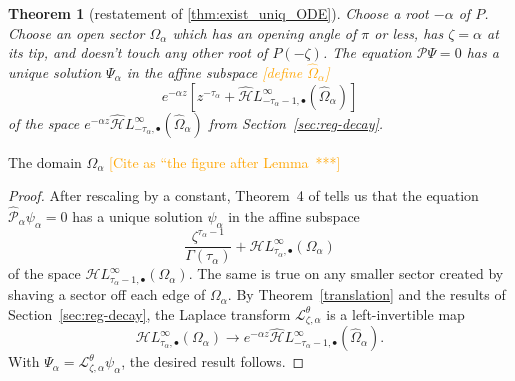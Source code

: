 \documentclass{article}
\newcommand{\singexp}[2]{\mathcal{H}L^\infty_{#1, #2}}
\newcommand{\singexpalg}[1]{\singexp{#1}{\bullet}}
\newcommand{\dualsingexp}[2]{\widehat{\mathcal{H}}L^\infty_{#1, #2}}
\newcommand{\dualsingexpalg}[1]{\dualsingexp{#1}{\bullet}}
\newcommand{\laplace}{\mathcal{L}}
\theoremstyle{definition}
\theoremstyle{plain}
\newtheorem{theorem}{Theorem}[section]
\begin{document}
\begin{theorem}[restatement of \ref{thm:exist_uniq_ODE}]\label{re:thm:exist_uniq_ODE}
Choose a root $-\alpha$ of $P$. Choose an open sector $\Omega_\alpha$ which has an opening angle of $\pi$ or less, has $\zeta = \alpha$ at its tip, and doesn't touch any other root of $P(-\zeta)$. The equation $\mathcal{P}\Psi = 0$ has a unique solution $\Psi_\alpha$ in the affine subspace \textcolor{orange}{[define $\widehat{\Omega}_\alpha$]}
\[ e^{-\alpha z} \left[ z^{-\tau_\alpha} + \dualsingexpalg{-\tau_\alpha-1}(\widehat{\Omega}_\alpha) \right] \]
of the space $e^{-\alpha z} \dualsingexpalg{-\tau_\alpha}(\widehat{\Omega}_\alpha)$ from Section~\ref{sec:reg-decay}.
\end{theorem}
\begin{center}

{\small The domain $\Omega_\alpha$ \textcolor{orange}{[Cite as ``the figure after Lemma~***]}}
\end{center}
\begin{proof}
After rescaling by a constant, Theorem~4 of \cite{reg-sing-volterra} tells us that the equation $\hat{\mathcal{P}}_\alpha \psi_\alpha = 0$ has a unique solution $\psi_\alpha$ in the affine subspace
\[ \frac{\zeta^{\tau_\alpha-1}}{\Gamma(\tau_\alpha)} + \singexpalg{\tau_\alpha}(\Omega_\alpha) \]
of the space $\singexpalg{\tau_\alpha-1}(\Omega_\alpha)$. The same is true on any smaller sector created by shaving a sector off each edge of $\Omega_\alpha$. By Theorem~\ref{translation} and the results of Section~\ref{sec:reg-decay}, the Laplace transform $\laplace^\theta_{\zeta, \alpha}$ is a left-invertible map
\[ \singexpalg{\tau_\alpha}(\Omega_\alpha) \to e^{-\alpha z} \dualsingexpalg{-\tau_\alpha-1}(\widehat{\Omega}_\alpha). \]
With $\Psi_\alpha = \laplace^\theta_{\zeta, \alpha} \psi_\alpha$, the desired result follows.
\end{proof}
\color{RoyalBlue}
\end{document}
